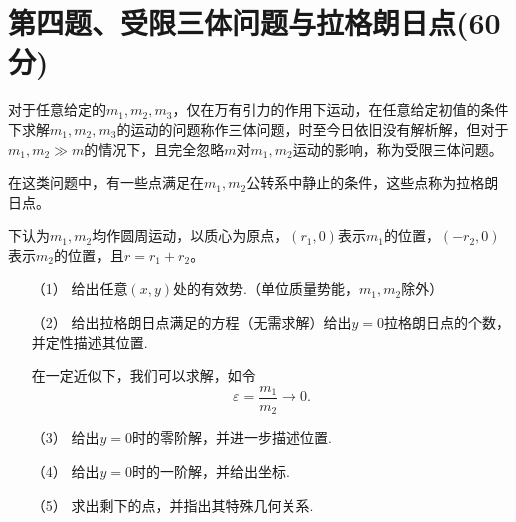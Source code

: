 \documentclass{article}
\begin{document}
\section*{第四题、受限三体问题与拉格朗日点(60分)}
	对于任意给定的$m_1,m_2,m_3$，仅在万有引力的作用下运动，在任意给定初值的条件下求解$m_1,m_2,m_3$的运动的问题称作三体问题，时至今日依旧没有解析解，但对于$m_1,m_2\gg m$的情况下，且完全忽略$m$对$m_1,m_2$运动的影响，称为受限三体问题。\par
	在这类问题中，有一些点满足在$m_1,m_2$公转系中静止的条件，这些点称为拉格朗日点。\par
	下认为$m_1,m_2$均作圆周运动，以质心为原点，$(r_1,0)$表示$m_1$的位置，$(-r_2,0)$表示$m_2$的位置，且$r=r_1+r_2$。\par
\begin{itemize}
\item[（1）]	给出任意$(x,y)$处的有效势.（单位质量势能，$m_1,m_2$除外）
\item[（2）]	给出拉格朗日点满足的方程（无需求解）给出$y=0$拉格朗日点的个数，并定性描述其位置.\par
在一定近似下，我们可以求解，如令
$$\varepsilon=\dfrac{m_1}{m_2}\to 0.$$
\item[（3）]	给出$y=0$时的零阶解，并进一步描述位置.
\item[（4）]	给出$y=0$时的一阶解，并给出坐标.
\item[（5）]	求出剩下的点，并指出其特殊几何关系.
\end{itemize}
\end{document}
